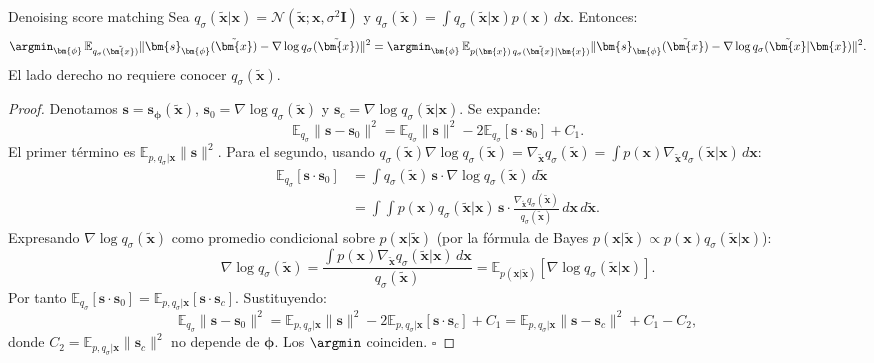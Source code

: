 \begin{teorema}{Denoising score matching}
\label{thm:dsm}
Sea $q_\sigma(\tilde{\bm{x}}|\bm{x}) = \mathcal{N}(\tilde{\bm{x}};\bm{x},\sigma^2\bm{I})$
y $q_\sigma(\tilde{\bm{x}}) = \int q_\sigma(\tilde{\bm{x}}|\bm{x})p(\bm{x})\,d\bm{x}$.
Entonces:
\[
  \argmin_{\bm{\phi}}\,\mathbb{E}_{q_\sigma(\tilde{\bm{x}})}
  \|\bm{s}_{\bm{\phi}}(\tilde{\bm{x}})-\nabla\log q_\sigma(\tilde{\bm{x}})\|^2
  =
  \argmin_{\bm{\phi}}\,\mathbb{E}_{p(\bm{x})\,q_\sigma(\tilde{\bm{x}}|\bm{x})}
  \|\bm{s}_{\bm{\phi}}(\tilde{\bm{x}})-\nabla\log q_\sigma(\tilde{\bm{x}}|\bm{x})\|^2.
\]
El lado derecho no requiere conocer $q_\sigma(\tilde{\bm{x}})$.
\end{teorema}

\begin{proof}
Denotamos $\bm{s} = \bm{s}_{\bm{\phi}}(\tilde{\bm{x}})$, $\bm{s}_0 = \nabla\log
q_\sigma(\tilde{\bm{x}})$ y $\bm{s}_c = \nabla\log q_\sigma(\tilde{\bm{x}}|\bm{x})$.
Se expande:
\[
  \mathbb{E}_{q_\sigma}\|\bm{s}-\bm{s}_0\|^2
  = \mathbb{E}_{q_\sigma}\|\bm{s}\|^2
  - 2\mathbb{E}_{q_\sigma}[\bm{s}\cdot\bm{s}_0]
  + C_1.
\]
El primer término es $\mathbb{E}_{p,q_\sigma|\bm{x}}\|\bm{s}\|^2$.
Para el segundo, usando $q_\sigma(\tilde{\bm{x}})\nabla\log q_\sigma(\tilde{\bm{x}})
= \nabla_{\tilde{\bm{x}}}q_\sigma(\tilde{\bm{x}}) = \int p(\bm{x})
\nabla_{\tilde{\bm{x}}}q_\sigma(\tilde{\bm{x}}|\bm{x})\,d\bm{x}$:
\begin{align*}
  \mathbb{E}_{q_\sigma}[\bm{s}\cdot\bm{s}_0]
  &= \int q_\sigma(\tilde{\bm{x}})\,\bm{s}\cdot\nabla\log q_\sigma(\tilde{\bm{x}})
    \,d\tilde{\bm{x}} \\
  &= \int\!\int p(\bm{x})q_\sigma(\tilde{\bm{x}}|\bm{x})\,\bm{s}
    \cdot\frac{\nabla_{\tilde{\bm{x}}}q_\sigma(\tilde{\bm{x}})}{q_\sigma(\tilde{\bm{x}})}
    \,d\bm{x}\,d\tilde{\bm{x}}.
\end{align*}
Expresando $\nabla\log q_\sigma(\tilde{\bm{x}})$ como promedio condicional
sobre $p(\bm{x}|\tilde{\bm{x}})$ (por la fórmula de Bayes $p(\bm{x}|\tilde{\bm{x}})
\propto p(\bm{x})q_\sigma(\tilde{\bm{x}}|\bm{x})$):
\[
  \nabla\log q_\sigma(\tilde{\bm{x}})
  = \frac{\int p(\bm{x})\nabla_{\tilde{\bm{x}}}q_\sigma(\tilde{\bm{x}}|\bm{x})
    \,d\bm{x}}{q_\sigma(\tilde{\bm{x}})}
  = \mathbb{E}_{p(\bm{x}|\tilde{\bm{x}})}[\nabla\log q_\sigma(\tilde{\bm{x}}|\bm{x})].
\]
Por tanto $\mathbb{E}_{q_\sigma}[\bm{s}\cdot\bm{s}_0]
= \mathbb{E}_{p,q_\sigma|\bm{x}}[\bm{s}\cdot\bm{s}_c]$.
Sustituyendo:
\[
  \mathbb{E}_{q_\sigma}\|\bm{s}-\bm{s}_0\|^2
  = \mathbb{E}_{p,q_\sigma|\bm{x}}\|\bm{s}\|^2
  - 2\mathbb{E}_{p,q_\sigma|\bm{x}}[\bm{s}\cdot\bm{s}_c] + C_1
  = \mathbb{E}_{p,q_\sigma|\bm{x}}\|\bm{s}-\bm{s}_c\|^2
  + C_1 - C_2,
\]
donde $C_2 = \mathbb{E}_{p,q_\sigma|\bm{x}}\|\bm{s}_c\|^2$ no depende de
$\bm{\phi}$. Los $\argmin$ coinciden. $\square$
\end{proof}

